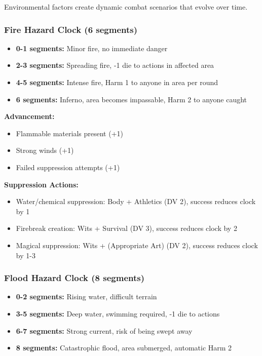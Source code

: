 \documentclass[11pt,letterpaper]{article}
\begin{document}
Environmental factors create dynamic combat scenarios that evolve over time.

\subsubsection{Fire Hazard Clock (6 segments)}

\begin{itemize}[leftmargin=*]
    \item \textbf{0-1 segments:} Minor fire, no immediate danger
    \item \textbf{2-3 segments:} Spreading fire, -1 die to actions in affected area
    \item \textbf{4-5 segments:} Intense fire, Harm 1 to anyone in area per round
    \item \textbf{6 segments:} Inferno, area becomes impassable, Harm 2 to anyone caught
\end{itemize}

\textbf{Advancement:}
\begin{itemize}[leftmargin=*]
    \item Flammable materials present (+1)
    \item Strong winds (+1)
    \item Failed suppression attempts (+1)
\end{itemize}

\textbf{Suppression Actions:}
\begin{itemize}[leftmargin=*]
    \item Water/chemical suppression: Body + Athletics (DV 2), success reduces clock by 1
    \item Firebreak creation: Wits + Survival (DV 3), success reduces clock by 2
    \item Magical suppression: Wits + (Appropriate Art) (DV 2), success reduces clock by 1-3
\end{itemize}

\subsubsection{Flood Hazard Clock (8 segments)}

\begin{itemize}[leftmargin=*]
    \item \textbf{0-2 segments:} Rising water, difficult terrain
    \item \textbf{3-5 segments:} Deep water, swimming required, -1 die to actions
    \item \textbf{6-7 segments:} Strong current, risk of being swept away
    \item \textbf{8 segments:} Catastrophic flood, area submerged, automatic Harm 2
\end{itemize}
\end{document}
